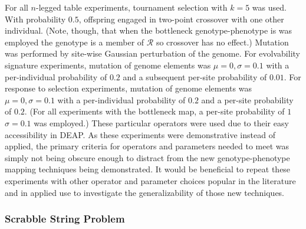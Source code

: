For all $n$-legged table experiments, tournament selection with $k = 5$ was used.
With probability $0.5$, offspring engaged in two-point crossover with one other individual.
(Note, though, that when the bottleneck genotype-phenotype is was employed the genotype is a member of $\mathcal{R}$ so crossover has no effect.)
Mutation was performed by site-wise Gaussian perturbation of the genome.
For evolvability signature experiments, mutation of genome elements was $\mu=0, \sigma=0.1$ with a per-individual probability of $0.2$ and a subsequent per-site probability of $0.01$.
For response to selection experiments, mutation of genome elements was $\mu=0, \sigma=0.1$ with a per-individual probability of $0.2$ and a per-site probability of $0.2$.
(For all experiments with the bottleneck map, a per-site probability of $1$ $\sigma=0.1$ was employed.)
These particular operators were used due to their easy accessibility in DEAP.
As these experiments were demonstrative instead of applied, the primary criteria
for operators and parameters needed to meet was simply not being obscure enough to distract from the new genotype-phenotype mapping techniques being demonstrated.
It would be beneficial to repeat these experiments with other operator and parameter choices popular in the literature and in applied use to investigate the generalizability of those new techniques.

\subsubsection{Scrabble String Problem}

